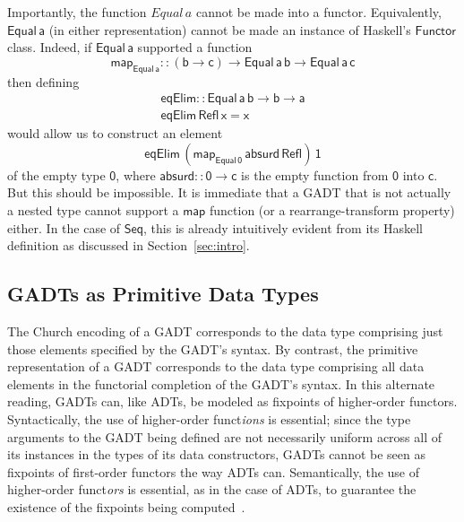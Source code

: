 \documentclass[acmsmall,screen,review,anonymous]{acmart}
\theoremstyle{definition}
\begin{document}
Importantly, the function $\mathit{Equal}\,a$ cannot be made into a
functor. Equivalently, $\mathsf{Equal\,a}$ (in either representation)
cannot be made an instance of Haskell's $\mathsf{Functor}$
class. Indeed, if $\mathsf{Equal\,a}$ supported a function
\[\mathsf{map_{Equal\,a} :: (b \to c) \to Equal\,a\,b \to
  Equal\,a\,c}\]
then defining
\[\begin{array}{l}
\mathsf{eqElim :: Equal\, a\, b \to b \to a}\\
\mathsf{eqElim\, Refl\, x = x} 
\end{array}\]
would allow us to construct
an element
\[\mathsf{eqElim\, (map_{Equal\,0}\, absurd\, Refl)\, 1}\]
of the empty type $\mathsf{0}$, where $\mathsf{absurd :: 0 \to c}$ is
the
empty function from  $\mathsf{0}$
into
$\mathsf{c}$.
But this should be impossible. It is immediate that a GADT that is not
actually a nested type cannot support a $\mathsf{map}$ function (or a
rearrange-transform property) either. In the case of $\mathsf{Seq}$,
this is already intuitively evident from its Haskell definition as
discussed in Section~\ref{sec:intro}.

\subsection{GADTs as Primitive Data Types}\label{sec:prim-gadts}

The Church encoding of a GADT corresponds to the data type comprising
just those elements specified by the GADT's syntax. By contrast, the
primitive representation of a GADT corresponds to the data type
comprising all data elements in the functorial completion of the
GADT's syntax. In this alternate reading, GADTs can, like ADTs, be
modeled as fixpoints of higher-order functors. Syntactically, the use
of higher-order funct{\em ions} is essential; since the type arguments
to the GADT being defined are not necessarily uniform across all of
its instances in the types of its data constructors, GADTs cannot be
seen as fixpoints of first-order functors the way ADTs
can. Semantically, the use of higher-order funct{\em ors} is
essential, as in the case of ADTs, to guarantee the existence of the
fixpoints being computed~\cite{tfca}.
\end{document}

